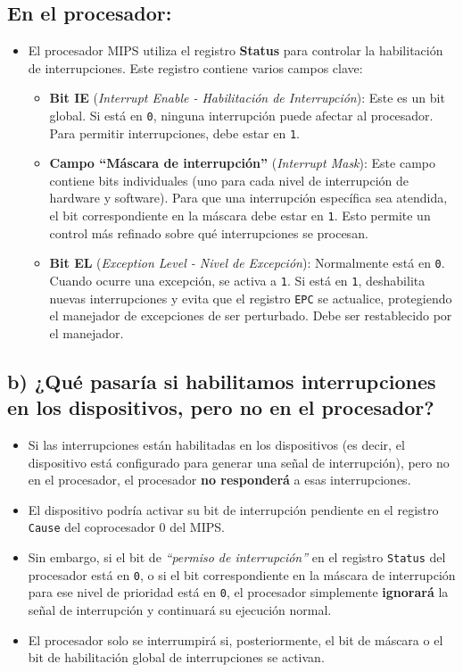 \documentclass{article}
\begin{document}
\subsection*{En el procesador:}
\begin{itemize}
    \item El procesador MIPS utiliza el registro \textbf{Status} para controlar la habilitación de interrupciones. Este registro contiene varios campos clave:
    \begin{itemize}
        \item \textbf{Bit IE} (\textit{Interrupt Enable - Habilitación de Interrupción}): Este es un bit global. Si está en \texttt{0}, ninguna interrupción puede afectar al procesador. Para permitir interrupciones, debe estar en \texttt{1}.
        \item \textbf{Campo ``Máscara de interrupción''} (\textit{Interrupt Mask}): Este campo contiene bits individuales (uno para cada nivel de interrupción de hardware y software). Para que una interrupción específica sea atendida, el bit correspondiente en la máscara debe estar en \texttt{1}. Esto permite un control más refinado sobre qué interrupciones se procesan.
        \item \textbf{Bit EL} (\textit{Exception Level - Nivel de Excepción}): Normalmente está en \texttt{0}. Cuando ocurre una excepción, se activa a \texttt{1}. Si está en \texttt{1}, deshabilita nuevas interrupciones y evita que el registro \texttt{EPC} se actualice, protegiendo el manejador de excepciones de ser perturbado. Debe ser restablecido por el manejador.
    \end{itemize}
\end{itemize}

\subsection*{b) ¿Qué pasaría si habilitamos interrupciones en los dispositivos, pero no en el procesador?}
\begin{itemize}
    \item Si las interrupciones están habilitadas en los dispositivos (es decir, el dispositivo está configurado para generar una señal de interrupción), pero no en el procesador, el procesador \textbf{no responderá} a esas interrupciones.
    \item El dispositivo podría activar su bit de interrupción pendiente en el registro \texttt{Cause} del coprocesador 0 del MIPS.
    \item Sin embargo, si el bit de \textit{``permiso de interrupción''} en el registro \texttt{Status} del procesador está en \texttt{0}, o si el bit correspondiente en la máscara de interrupción para ese nivel de prioridad está en \texttt{0}, el procesador simplemente \textbf{ignorará} la señal de interrupción y continuará su ejecución normal.
    \item El procesador solo se interrumpirá si, posteriormente, el bit de máscara o el bit de habilitación global de interrupciones se activan.
\end{itemize}
\end{document}
